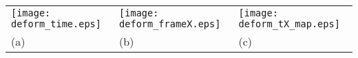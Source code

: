 \documentclass[10pt,a4paper]{article}
\begin{document}
  \begin{tabular}{l@{}l@{}l}
        \texttt{[image: deform\_time.eps]}&    \texttt{[image: deform\_frameX.eps]}&
                                                     \texttt{[image: deform\_tX\_map.eps]}\\
    (a)&(b)&(c)
  \end{tabular}
\end{document}
